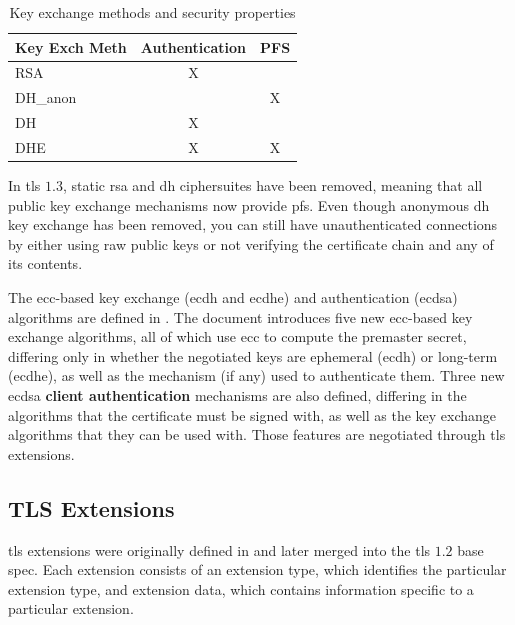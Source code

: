 \documentclass{llncs}
\begin{document}
{\begin{table}[]
\centering
\caption{Key exchange methods and security properties}
\label{kemsp}
\begin{tabular}{|l|c|l|}
\hline
\textbf{Key Exch Meth} & \multicolumn{1}{l|}{Authentication} & PFS                    \\ \hline
RSA                          & X                                   &                        \\ \hline
DH\_anon                     & \multicolumn{1}{l|}{}               & \multicolumn{1}{c|}{X} \\ \hline
DH                           & X                                   &                        \\ \hline
DHE                          & X                                   & \multicolumn{1}{c|}{X} \\ \hline
\end{tabular}
\end{table}

In \gls{tls} $1.3$, static \gls{rsa} and \gls{dh} ciphersuites have been removed, meaning that all
public key exchange mechanisms now provide \gls{pfs}. Even though
anonymous \gls{dh} key exchange has been removed, you can still have
unauthenticated connections by either using raw public keys\cite{RFC7250} or not verifying the certificate chain and any of its contents.

The \gls{ecc}-based key exchange (\gls{ecdh} and \gls{ecdhe}) and authentication (\gls{ecdsa})
algorithms are defined in \cite{RFC4292}. The document introduces five new
\gls{ecc}-based key exchange algorithms, all of which use \gls{ecc} to compute
the premaster secret, differing only in whether the negotiated
keys are ephemeral (\gls{ecdh}) or long-term (\gls{ecdhe}), as well as the mechanism (if any) used to
authenticate them. Three new \gls{ecdsa} \textbf{client authentication} mechanisms are also defined,
differing in the algorithms that the certificate must be signed with, as well
as the key exchange algorithms that they can be used with.
Those features are negotiated through \gls{tls} extensions.

\subsection{TLS Extensions} \label{extensions}

\gls{tls} extensions were originally defined in \cite{RFC4366}
and later merged into the \gls{tls} $1.2$ base spec. Each extension consists of an
extension type, which identifies the particular extension type, and extension data,
which contains information specific to a particular extension.

}
\end{document}

